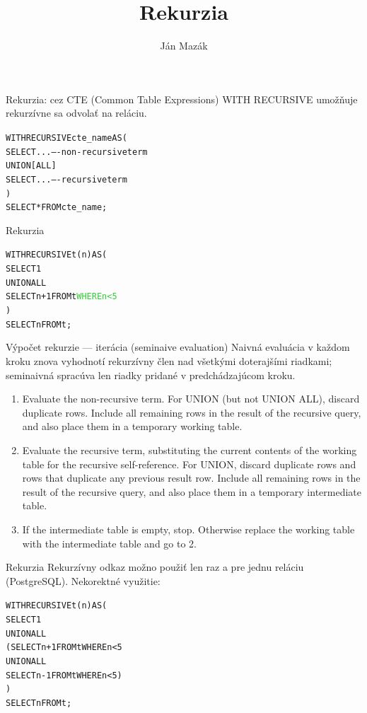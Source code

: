 \documentclass[12pt]{beamer}
\title{Rekurzia}
\author{Ján Mazák}
\institute{FMFI UK Bratislava}
\date{}
\def\blue#1{\textcolor{Cerulean}{#1}}
\def\green#1{\textcolor{LimeGreen}{#1}}
\begin{document}
\frame{\titlepage}

\begin{frame}[fragile]{Rekurzia: cez CTE (Common Table Expressions)}
\alert{WITH RECURSIVE} umožňuje rekurzívne sa odvolať na reláciu.
\bigskip
\begin{alltt}
\alert{WITH RECURSIVE} cte_name AS(
    SELECT ...  ---- non-recursive term
  UNION [ALL]
    SELECT ...  ---- recursive term
)
SELECT * FROM cte_name;
\end{alltt}
\end{frame}

\begin{frame}[fragile]{Rekurzia}
\begin{alltt}
\alert{WITH RECURSIVE} t(n) AS (
    SELECT 1
  UNION ALL
    SELECT n+1 FROM t \green{WHERE n < 5}
)
SELECT n FROM t;
\end{alltt}
\end{frame}

\begin{frame}[fragile]{Výpočet rekurzie --- iterácia (seminaive evaluation)}
Naivná evaluácia v každom kroku znova vyhodnotí rekurzívny člen nad všetkými doterajšími riadkami; seminaivná spracúva len riadky pridané v predchádzajúcom kroku.
\begin{enumerate}
\item Evaluate the \blue{non-recursive} term. For UNION (but not UNION ALL), discard duplicate rows.
Include all remaining rows in the result of the recursive query, and also place them in a temporary working table.

\item Evaluate the \blue{recursive} term, substituting the current contents of the working table for the recursive self-reference.
For UNION, discard duplicate rows and rows that duplicate any previous result row.
Include all remaining rows in the result of the recursive query, and also place them in a temporary intermediate table.

\item If the intermediate table is empty, stop. Otherwise replace the working table with the intermediate table and go to 2.
\end{enumerate}
\end{frame}

\begin{frame}[fragile]{Rekurzia}
Rekurzívny odkaz možno použiť len raz a pre jednu reláciu (PostgreSQL).
\alert{Nekorektné} využitie:
\begin{alltt}
WITH RECURSIVE t(n) AS (
    SELECT 1
  UNION ALL
    (SELECT n+1 FROM \blue{t} WHERE n < 5
        UNION ALL
     SELECT n-1 FROM \blue{t} WHERE n < 5)
)
SELECT n FROM t;
\end{alltt}
\end{frame}
\end{document}
